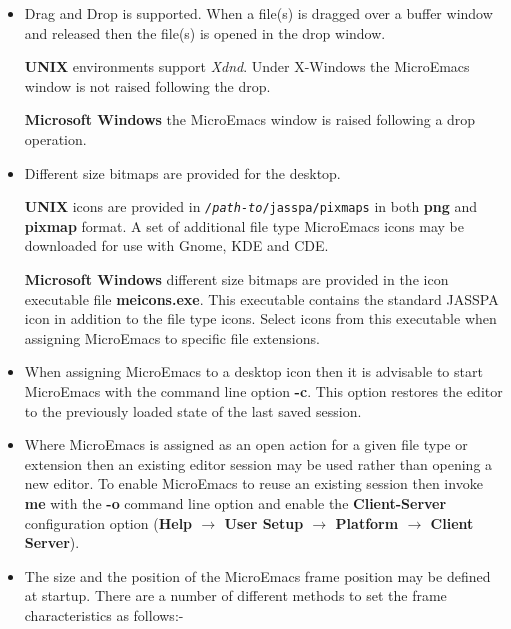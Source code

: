 \documentclass[11pt,a4paper,pdftex]{article}
\begin{document}
  \begin{itemize}

    \item Drag and Drop is supported. When a file(s) is dragged over a buffer
    window and released then the file(s) is opened in the drop window.

    \textbf{UNIX} environments support \textit{Xdnd}. Under X-Windows the
    MicroEmacs window is not raised following the drop.

    \textbf{Microsoft Windows} the MicroEmacs window is raised following
    a drop operation.

    \item Different size bitmaps are provided for the desktop.

    \textbf{UNIX} icons are provided in
    \texttt{\textit{/path-to}/jasspa/pixmaps} in both \textbf{png} and
    \textbf{pixmap} format. A set of additional file type MicroEmacs icons may
    be downloaded for use with Gnome, KDE and CDE.

    \textbf{Microsoft Windows} different size bitmaps are provided in the icon
    executable file \textbf{meicons.exe}. This executable contains the
    standard JASSPA icon in addition to the file type icons. Select icons from
    this executable when assigning MicroEmacs to specific file extensions.

    \item When assigning MicroEmacs to a desktop icon then it is advisable to
    start MicroEmacs with the command line option \textbf{-c}. This option
    restores the editor to the previously loaded state of the last saved
    session.

    \item Where MicroEmacs is assigned as an open action for a given file type
    or extension then an existing editor session may be used rather than
    opening a new editor. To enable MicroEmacs to reuse an existing session
    then invoke \textbf{me} with the \textbf{-o} command line option and
    enable the \textbf{Client-Server} configuration option (\textbf{Help
    $\rightarrow$ User Setup $\rightarrow$ Platform $\rightarrow$ Client
    Server}).

    \item The size and the position of the MicroEmacs frame position may be
    defined at startup. There are a number of different methods to set the
    frame characteristics as follows:-

    \begin{itemize}


\end{itemize}
\end{itemize}
\end{document}
